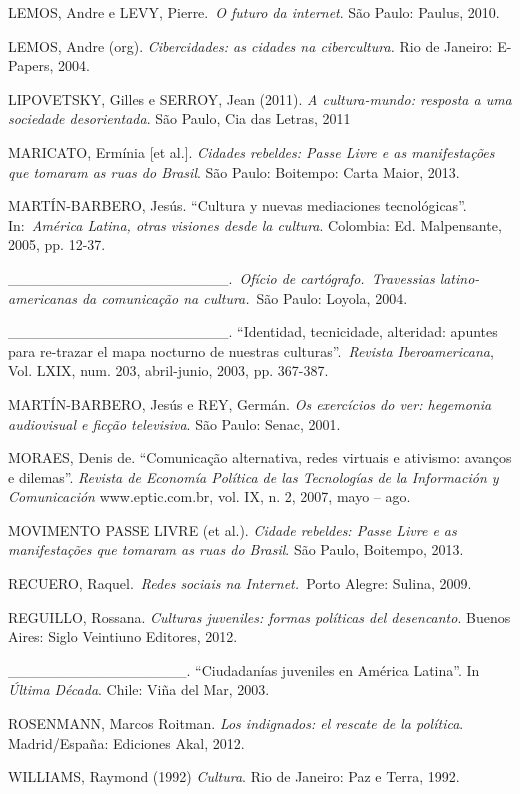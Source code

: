 LEMOS, Andre e LEVY, Pierre.~\emph{O futuro da internet}. São Paulo:
Paulus, 2010.

LEMOS, Andre (org). \emph{Cibercidades: as cidades na cibercultura.} Rio
de Janeiro: E-Papers, 2004.

LIPOVETSKY, Gilles e SERROY, Jean (2011). \emph{A cultura-mundo:
resposta a uma sociedade desorientada}. São Paulo, Cia das Letras, 2011

MARICATO, Ermínia {[}et al.{]}. \emph{Cidades rebeldes: Passe Livre e as
manifestações que tomaram as ruas do Brasil}. São Paulo: Boitempo: Carta
Maior, 2013.

MARTÍN-BARBERO, Jesús. ``Cultura y nuevas mediaciones tecnológicas''.
In:~\emph{América Latina, otras visiones desde la cultura}. Colombia:
Ed. Malpensante, 2005, pp. 12-37.

\_\_\_\_\_\_\_\_\_\_\_\_\_\_\_\_\_\_\_\_\_.~\emph{Ofício de
cartógrafo.~Travessias latino-americanas da comunicação na cultura.}~São
Paulo: Loyola, 2004.

\_\_\_\_\_\_\_\_\_\_\_\_\_\_\_\_\_\_\_\_\_. ``Identidad, tecnicidade,
alteridad: apuntes para re-trazar el mapa nocturno de nuestras
culturas''.~\emph{Revista Iberoamericana}, Vol. LXIX, num. 203,
abril-junio, 2003, pp. 367-387.

MARTÍN-BARBERO, Jesús e REY, Germán. \emph{Os exercícios do ver:
hegemonia audiovisual e ficção televisiva}. São Paulo: Senac, 2001.

MORAES, Denis de. ``Comunicação alternativa, redes virtuais e ativismo:
avanços e dilemas''. \emph{Revista de Economía Política de las
Tecnologías de la Información y Comunicación} www.eptic.com.br, vol. IX,
n. 2, 2007, mayo -- ago.

MOVIMENTO PASSE LIVRE (et al.). \emph{Cidade rebeldes: Passe Livre e as
manifestações que tomaram as ruas do Brasil}. São Paulo, Boitempo, 2013.

RECUERO, Raquel.~\emph{Redes sociais na Internet.~}Porto Alegre: Sulina,
2009.

REGUILLO, Rossana. \emph{Culturas juveniles: formas políticas del
desencanto}. Buenos Aires: Siglo Veintiuno Editores, 2012.

\_\_\_\_\_\_\_\_\_\_\_\_\_\_\_\_\_. ``Ciudadanías juveniles en América
Latina''. In \emph{Última Década}. Chile: Viña del Mar, 2003.

ROSENMANN, Marcos Roitman. \emph{Los indignados: el rescate de la
política}. Madrid/España: Ediciones Akal, 2012.

WILLIAMS, Raymond (1992) \emph{Cultura}. Rio de Janeiro: Paz e Terra,
1992.

